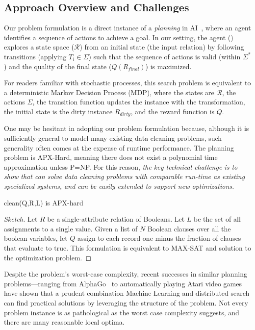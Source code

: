 \subsection{Approach Overview and Challenges}

Our problem formulation is a direct instance of a {\it planning} in AI~\cite{russell1995modern}, where an agent identifies a sequence of actions to achieve a goal.  In our setting, the agent (\sys) explores a state space ($\mathcal{R}$) from an initial state (the input relation) by following transitions (applying $T_i \in \Sigma$) such that the sequence of actions is valid (within $\Sigma^*$) and the quality of the final state ($Q(R_{final})$) is maximized.  

For readers familiar with stochastic processes, this search problem is equivalent to a deterministic Markov Decision Process (MDP), where the states are $\mathcal{R}$, the actions $\Sigma$, the transition function updates the instance with the transformation, the initial state is the dirty instance $R_{dirty}$, and the reward function is $Q$.

One may be hesitant in adopting our problem formulation because, although it is sufficiently general to model many existing data cleaning problems, such generality often comes at the expense of runtime performance.   The planning problem is APX-Hard, meaning there does not exist a polynomial time approximation unless P=NP.  For this reason, {\it the key technical challenge is to show that \sys can solve data cleaning problems with comparable run-time as existing specialized systems, and can be easily extended to support new optimizations.}

\begin{theorem}[Hardness]
\textsf{clean}(Q,R,L) is APX-hard
\end{theorem}
\begin{proof}[Sketch]
Let $R$ be a single-attribute relation of Booleans. Let $L$ be the set of all assignments to a single value.
Given a list of $N$ Boolean clauses over all the boolean variables, let $Q$ assign to each record one minus the fraction of clauses that evaluate to true. This formulation is equivalent to MAX-SAT and solution to the optimization problem. 
\end{proof}

Despite the problem's worst-case complexity, 
recent successes in similar planning problems---ranging from AlphaGo~\cite{silver2016mastering} to automatically playing Atari video games~\cite{mnih2015human} have shown that a prudent combination Machine Learning and distributed search can find practical solutions by leveraging the structure of the problem. 
Not every problem instance is as pathological as the worst case complexity suggests, and there are many reasonable local optima.

